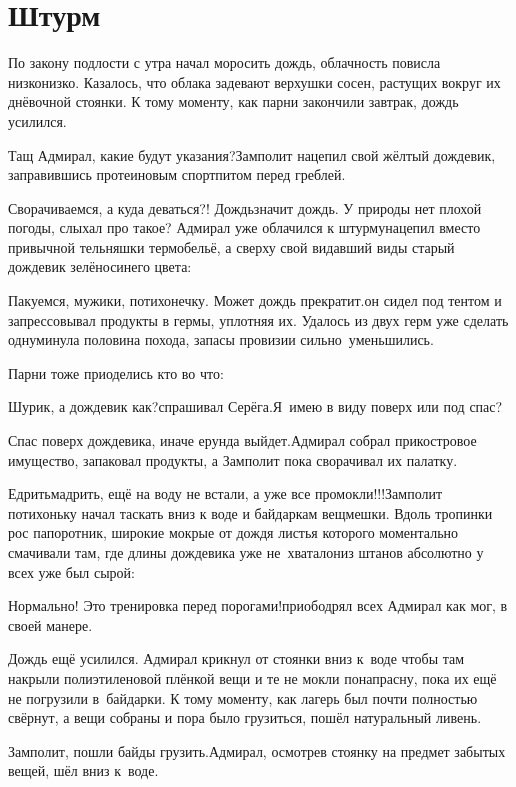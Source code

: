 \chapter{Штурм}
\vepsianrose

По закону подлости с утра начал моросить дождь, облачность повисла низко\sdash низко. Казалось, что облака задевают верхушки сосен, растущих вокруг их днёвочной стоянки. К тому моменту, как парни закончили завтрак, дождь усилился.

\diagdash Тащ Адмирал, какие будут указания?\mdash Замполит нацепил свой жёлтый дождевик, заправившись протеиновым спортпитом перед греблей.

\diagdash Сворачиваемся, а куда деваться?! Дождь\mdash значит дождь. У природы нет плохой погоды, слыхал про такое? \mdash Адмирал уже облачился к штурму\mdash нацепил вместо привычной тельняшки термобельё, а сверху свой видавший виды старый дождевик зелёно\sdash синего цвета:

\diagdash Пакуемся, мужики, потихонечку. Может дождь прекратит.\mdash он сидел под тентом и запрессовывал продукты в гермы, уплотняя их. Удалось из двух герм уже сделать одну\mdash минула половина похода, запасы провизии сильно~уменьшились.

Парни тоже приоделись кто во что: 

\diagdash Шурик, а дождевик как?\mdash спрашивал Серёга.\mdash Я~имею в виду поверх или под спас?

\diagdash Спас поверх дождевика, иначе ерунда выйдет.\mdash Адмирал собрал прикостровое имущество, запаковал продукты, а Замполит пока сворачивал их палатку.

\diagdash Едрить\sdash мадрить, ещё на воду не встали, а уже все промокли!!!\mdash Замполит потихоньку начал таскать вниз к воде и байдаркам вещмешки. Вдоль тропинки рос папоротник, широкие мокрые от дождя листья которого моментально смачивали там, где длины дождевика уже не~хватало\mdash низ штанов абсолютно у всех уже был сырой:

\diagdash Нормально! Это тренировка перед порогами!\mdash приободрял всех Адмирал как мог, в своей манере.

Дождь ещё усилился. Адмирал крикнул от стоянки вниз к~воде чтобы там накрыли полиэтиленовой плёнкой вещи и те не мокли понапрасну, пока их ещё не погрузили в~байдарки. К тому моменту, как лагерь был почти полностью свёрнут, а вещи собраны и пора было грузиться, пошёл натуральный ливень.

\diagdash Замполит, пошли байды грузить.\mdash Адмирал, осмотрев стоянку на предмет забытых вещей, шёл вниз к~воде.

